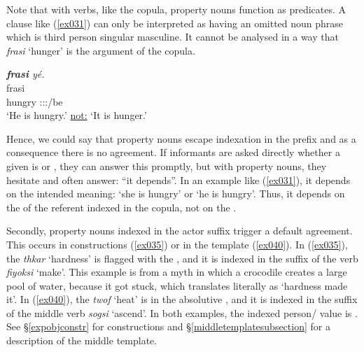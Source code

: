 Note that with  verbs, like the copula, property nouns function as  predicates. A clause like (\ref{ex031}) can only be interpreted as having an omitted  noun phrase which is third person singular masculine. It cannot be analysed in a way that \emph{frasi} `hunger' is the argument of the copula.

\begin{exe}
	\ex \emph{\textbf{frasi} yé.}\\
	\gll frasi \\
	hungry \Tsg\Masc:\Sbj:\Nonpast:\Ipfv/be\\
	\trans `He is hungry.' \uline{not:} `It is hunger.'
	\label{ex031}
\end{exe}

Hence, we could say that property nouns escape indexation in the  prefix and as a consequence there is no  agreement. If informants are asked directly whether a given  is  or , they can answer this promptly, but with property nouns, they hesitate and often answer: ``it depends''. In an example like (\ref{ex031}), it depends on the intended meaning: `she is hungry' or `he is hungry'. Thus, it depends on the  of the referent indexed in the copula, not on the .

Secondly, property nouns indexed in the actor suffix trigger a default   agreement. This occurs in  constructions (\ref{ex035}) or in the  template (\ref{ex040}). In (\ref{ex035}), the  \emph{thkar} `hardness' is flagged with the  , and it is indexed in the suffix of the verb \emph{fiyoksi} `make'. This example is from a myth in which a crocodile creates a large pool of water, because it got stuck, which translates literally as `hardness made it'. In (\ref{ex040}), the  \emph{twof} `heat' is in the absolutive , and it is indexed in the suffix of the middle verb \emph{sogsi} `ascend'. In both examples, the indexed person/ value is \Stsg. See {\S}\ref{expobjconstr} for  constructions and {\S}\ref{middletemplatesubsection} for a description of the middle template.

